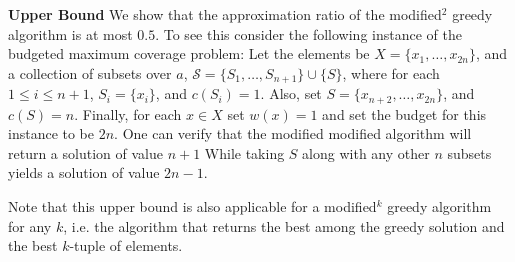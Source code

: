 \textbf{Upper Bound}
We show that the approximation ratio of the modified$^2$ greedy algorithm is at most $0.5$.
To see this consider the following instance of the budgeted maximum coverage problem:
Let the elements be $X = \{x_1, \dots, x_{2n}\}$, 
and a collection of subsets over $a$, $\mathcal{S} = \{S_1, \dots, S_{n + 1}\} \cup \{S\}$,
where for each $1 \leq i \leq n + 1$, $S_i = \{x_i\}$, and $c(S_i) = 1$. 
Also, set $S = \{x_{n + 2}, \dots, x_{2n}\}$, and $c(S) = n$.
Finally, for each $x \in X$ set $w(x) = 1$ and set the budget for this instance to be $2n$.
One can verify that the modified modified algorithm will return a solution of value $n + 1$
While taking $S$ along with any other $n$ subsets yields a solution of value $2n - 1$.  

Note that this upper bound is also applicable for a modified$^k$ greedy algorithm for any $k$, i.e. the algorithm that returns the best among the greedy solution and the best $k$-tuple of elements.



